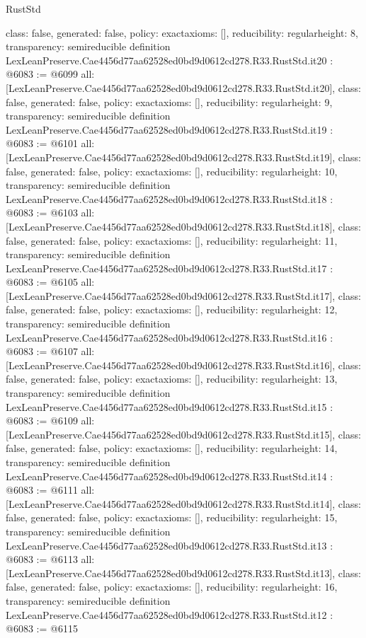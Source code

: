 \begin{lexlean}{RustStd}
\begin{coremodule}
{  class: false,
  generated: false,
  policy: exact{axioms: []},
  reducibility: regular{height: 8},
  transparency: semireducible
}
definition LexLeanPreserve.Cae4456d77aa62528ed0bd9d0612cd278.R33.RustStd.it20 : @6083 := @6099 {
  all: [LexLeanPreserve.Cae4456d77aa62528ed0bd9d0612cd278.R33.RustStd.it20],
  class: false,
  generated: false,
  policy: exact{axioms: []},
  reducibility: regular{height: 9},
  transparency: semireducible
}
definition LexLeanPreserve.Cae4456d77aa62528ed0bd9d0612cd278.R33.RustStd.it19 : @6083 := @6101 {
  all: [LexLeanPreserve.Cae4456d77aa62528ed0bd9d0612cd278.R33.RustStd.it19],
  class: false,
  generated: false,
  policy: exact{axioms: []},
  reducibility: regular{height: 10},
  transparency: semireducible
}
definition LexLeanPreserve.Cae4456d77aa62528ed0bd9d0612cd278.R33.RustStd.it18 : @6083 := @6103 {
  all: [LexLeanPreserve.Cae4456d77aa62528ed0bd9d0612cd278.R33.RustStd.it18],
  class: false,
  generated: false,
  policy: exact{axioms: []},
  reducibility: regular{height: 11},
  transparency: semireducible
}
definition LexLeanPreserve.Cae4456d77aa62528ed0bd9d0612cd278.R33.RustStd.it17 : @6083 := @6105 {
  all: [LexLeanPreserve.Cae4456d77aa62528ed0bd9d0612cd278.R33.RustStd.it17],
  class: false,
  generated: false,
  policy: exact{axioms: []},
  reducibility: regular{height: 12},
  transparency: semireducible
}
definition LexLeanPreserve.Cae4456d77aa62528ed0bd9d0612cd278.R33.RustStd.it16 : @6083 := @6107 {
  all: [LexLeanPreserve.Cae4456d77aa62528ed0bd9d0612cd278.R33.RustStd.it16],
  class: false,
  generated: false,
  policy: exact{axioms: []},
  reducibility: regular{height: 13},
  transparency: semireducible
}
definition LexLeanPreserve.Cae4456d77aa62528ed0bd9d0612cd278.R33.RustStd.it15 : @6083 := @6109 {
  all: [LexLeanPreserve.Cae4456d77aa62528ed0bd9d0612cd278.R33.RustStd.it15],
  class: false,
  generated: false,
  policy: exact{axioms: []},
  reducibility: regular{height: 14},
  transparency: semireducible
}
definition LexLeanPreserve.Cae4456d77aa62528ed0bd9d0612cd278.R33.RustStd.it14 : @6083 := @6111 {
  all: [LexLeanPreserve.Cae4456d77aa62528ed0bd9d0612cd278.R33.RustStd.it14],
  class: false,
  generated: false,
  policy: exact{axioms: []},
  reducibility: regular{height: 15},
  transparency: semireducible
}
definition LexLeanPreserve.Cae4456d77aa62528ed0bd9d0612cd278.R33.RustStd.it13 : @6083 := @6113 {
  all: [LexLeanPreserve.Cae4456d77aa62528ed0bd9d0612cd278.R33.RustStd.it13],
  class: false,
  generated: false,
  policy: exact{axioms: []},
  reducibility: regular{height: 16},
  transparency: semireducible
}
definition LexLeanPreserve.Cae4456d77aa62528ed0bd9d0612cd278.R33.RustStd.it12 : @6083 := @6115 {
}
\end{coremodule}
\end{lexlean}
